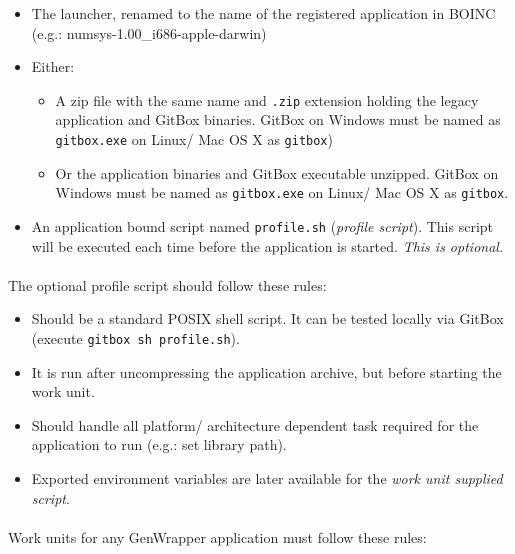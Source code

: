 \documentclass[a4paper,12pt,titlepage,dvipdfm]{article}
\begin{document}
\begin{itemize}
    \item The launcher, renamed to the name of the registered application in BOINC (e.g.: numsys-1.00\_i686-apple-darwin)
    \item Either:
        \begin{itemize}
            \item A zip file with the same name and \texttt{.zip} extension holding the legacy application and GitBox binaries. GitBox on Windows must be named as \texttt{gitbox.exe} on Linux/ Mac OS X as \texttt{gitbox})
            \item Or the application binaries and GitBox executable unzipped. GitBox on Windows must be named as \texttt{gitbox.exe} on Linux/ Mac OS X as \texttt{gitbox}.
        \end{itemize}
    \item An application bound script named \texttt{profile.sh} (\emph{profile script}). This script will be executed each time before the application is started. \emph{This is optional.}
\end{itemize}

\paragraph*{}The optional profile script should follow these rules:

\begin{itemize}
    \item Should be a standard POSIX shell script. It can be tested locally via GitBox (execute \texttt{gitbox sh profile.sh}).
    \item It is run after uncompressing the application archive, but before starting the work unit.
    \item Should handle all platform/ architecture dependent task required for the application to run (e.g.: set library path).
    \item Exported environment variables are later available for the \emph{work unit supplied script}.   
\end{itemize}

\paragraph*{}Work units for any GenWrapper application must follow these rules:
\end{document}
